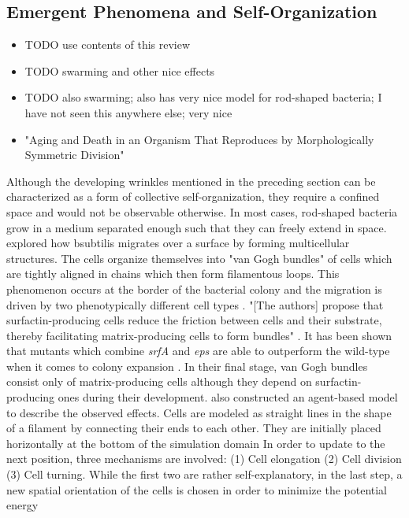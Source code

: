\documentclass{article}
\begin{document}
\subsection{Emergent Phenomena and Self-Organization}

\begin{itemize}
    \item \cite{Nagarajan2022} TODO use contents of this review
    \item \cite{Ingham2008} TODO swarming and other nice effects
    \item \cite{Starru} TODO also swarming; also has very nice model for rod-shaped bacteria; I have
        not seen this anywhere else; very nice
    \item \cite{Stewart2005} "Aging and Death in an Organism That Reproduces by Morphologically
        Symmetric Division"
\end{itemize}

Although the developing wrinkles mentioned in the preceding section can be characterized as a form
of collective self-organization, they require a confined space and would not be observable
otherwise.
In most cases, rod-shaped bacteria grow in a medium separated enough such that they can freely
extend in space.
\cite{vanGestel2015} explored how \ac{bsubtilis} migrates over a surface by forming multicellular
structures.
The cells organize themselves into "van Gogh bundles" of cells
which are tightly aligned in chains which then form filamentous loops.
This phenomenon occurs at the border of the bacterial colony and the migration is driven by two
phenotypically different cell types \cite{Lpez2010}.
"[The authors] propose that surfactin-producing cells reduce the friction between cells and their
substrate, thereby facilitating matrix-producing cells to form bundles" \cite{vanGestel2015}.
It has been shown that mutants which combine \textit{srfA} and \textit{eps} are able to outperform
the wild-type when it comes to colony expansion \cite{Velicer2009}.
In their final stage, van Gogh bundles consist only of matrix-producing cells although they depend
on surfactin-producing ones during their development.
\cite{vanGestel2015} also constructed an agent-based model to describe the observed effects.
Cells are modeled as straight lines in the shape of a filament by connecting their ends to each
other.
They are initially placed horizontally at the bottom of the simulation domain
In order to update to the next position, three mechanisms are involved: (1) Cell elongation (2) Cell
division (3) Cell turning.
While the first two are rather self-explanatory, in the last step, a new spatial orientation of the
cells is chosen in order to minimize the potential energy
\end{document}
